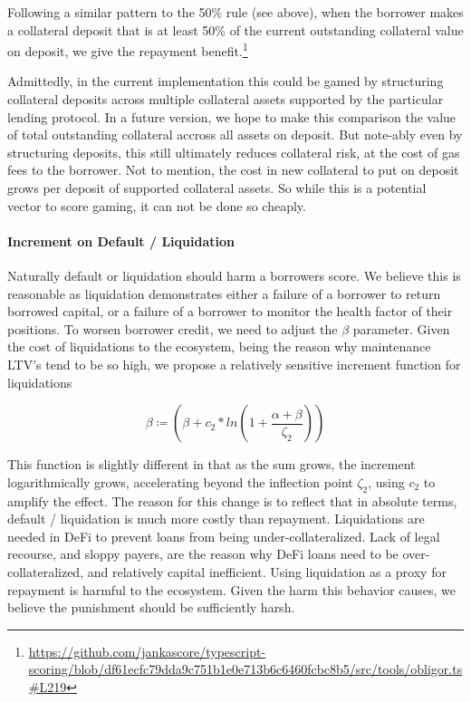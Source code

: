 \documentclass{article}
\begin{document}
Following a similar pattern to the 50\% rule (see above), when the borrower makes a collateral deposit that is at least 50\% of the current outstanding collateral value on deposit, we give the repayment benefit.\footnote{\url{https://github.com/jankascore/typescript-scoring/blob/df61ecfc79dda9c751b1e0e713b6c6460fcbc8b5/src/tools/obligor.ts\#L219}}

Admittedly, in the current implementation this could be gamed by structuring collateral deposits across multiple collateral assets supported by the particular lending protocol. In a future version, we hope to make this comparison the value of total outstanding collateral accross all assets on deposit. But note-ably even by structuring deposits, this still ultimately reduces collateral risk, at the cost of gas fees to the borrower. Not to mention, the cost in new collateral to put on deposit grows per deposit of supported collateral assets. So while this is a potential vector to score gaming, it can not be done so cheaply.

\paragraph{Increment on Default / Liquidation}

Naturally default or liquidation should harm a borrowers score. We believe this is reasonable as liquidation demonstrates either a failure of a borrower to return borrowed capital, or a failure of a borrower to monitor the health factor of their positions. To worsen borrower credit, we need to adjust the $\beta$ parameter. Given the cost of liquidations to the ecosystem, being the reason why maintenance LTV's tend to be so high, we propose a relatively sensitive increment function for liquidations

\begin{equation}
\beta \coloneqq (\beta + c_2*ln(1+\frac{\alpha+\beta}{\zeta_2}))
\end{equation}

This function is slightly different in that as the sum grows, the increment logarithmically grows, accelerating beyond the inflection point $\zeta_2$, using $c_2$ to amplify the effect. The reason for this change is to reflect that in absolute terms, default / liquidation is much more costly than repayment. Liquidations are needed in DeFi to prevent loans from being under-collateralized. Lack of legal recourse, and sloppy payers, are the reason why DeFi loans need to be over-collateralized, and relatively capital inefficient. Using liquidation as a proxy for repayment is harmful to the ecosystem. Given the harm this behavior causes, we believe the punishment should be sufficiently harsh. 
\end{document}
